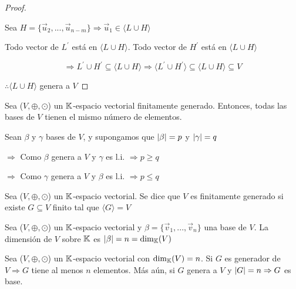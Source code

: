 \begin{proof}
\begin{enumerate}
        Sea $H = \{ \vec{u}_{2},...,\vec{u}_{n-m}\} \Rightarrow \vec{u}_{1} \in \langle L \cup H \rangle$

        Todo vector de $L^\prime$ está en $ \langle L \cup H \rangle$. Todo vector de $H^\prime$ está en $ \langle L \cup H \rangle$

        $$\Rightarrow L^\prime \cup H^\prime \subseteq  \langle L \cup H \rangle \Rightarrow \langle L^\prime \cup H^\prime \rangle  \subseteq  \langle L \cup H \rangle \subseteq V$$
    \end{enumerate}

    $\therefore \langle L \cup H \rangle$ genera a $V$
\end{proof}

\begin{corollary}
     Sea ($V, \oplus, \odot$) un $\mathbb{K}$-espacio vectorial finitamente generado. Entonces, todas las bases de $V$ tienen el mismo número de elementos.
\end{corollary}

\begin{orangeproof}
    Sean $\beta$ y $\gamma$ bases de $V$, y supongamos que $\abs{\beta} = p$ y $\abs{\gamma} = q$

    $\Rightarrow$ Como $\beta$ genera a $V$ y $\gamma$ es l.i. $\Rightarrow p \geqslant q$
    
    $\Rightarrow$ Como $\gamma$ genera a $V$ y $\beta$ es l.i. $\Rightarrow p \leqslant q$
\end{orangeproof}

\begin{definition}
     Sea ($V, \oplus, \odot$) un $\mathbb{K}$-espacio vectorial. Se dice que $V$ es finitamente generado si existe $G \subseteq V$ finito tal que $\langle G \rangle = V$
\end{definition}

\begin{definition}[Dimensión]
     Sea ($V, \oplus, \odot$) un $\mathbb{K}$-espacio vectorial y $\beta = \{ \vec{v}_{1} , ... , \vec{v}_{n} \}$ una base de $V$. La dimensión de $V$ sobre $\mathbb{K}$ es $\abs{\beta} = n = {\text{dim}}_{\mathbb{K}}(V)$
\end{definition}

\begin{corollary}
    Sea ($V, \oplus, \odot$) un $\mathbb{K}$-espacio vectorial con ${\dim}_{\mathbb{K}}(V) = n$. Si $G$ es generador de $V \Rightarrow G$ tiene al menos $n$ elementos. Más aún, si $G$ genera a $V$ y $\abs{G}=n \Rightarrow G$ es base.
\end{corollary}

